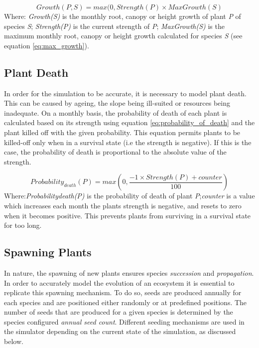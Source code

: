 \begin{equation}
Growth(\textit{P},S) = max(0, Strength(\textit{P}) \times  MaxGrowth(S)
\label{eq:actual_growth}
\end{equation}
Where: \textit{Growth(S)} is the monthly root, canopy or height growth of plant \textit{P} of species \textit{S}; \textit{Strength(P)} is the current strength of \textit{P}; \textit{MaxGrowth(S)} is the maximum monthly root, canopy or height growth calculated for species \textit{S} (see equation \ref{eq:max_growth}).

\subsection{Plant Death}

In order for the simulation to be accurate, it is necessary to model plant death. This can be caused by ageing, the slope being ill-suited or resources being inadequate. On a monthly basis, the probability of death of each plant is calculated based on its strength using equation \ref{eq:probability_of_death} and the plant killed off with the given probability. This equation permits plants to be killed-off only when in a survival state (i.e the strength is negative). If this is the case, the probability of death is proportional to the absolute value of the strength. 

\begin{equation}
Probability_{death}(P) = max(0, \frac{-1 \times Strength(P) + counter}{100})
\label{eq:probability_of_death}
\end{equation}
Where:\textit{Probability{death}(P)} is the probability of death of plant \textit{P};\textit{counter} is a value which increases each month the plants strength is negative, and resets to zero when it becomes positive. This prevents plants from surviving in a survival state for too long.

\subsection{Spawning Plants} \label{subsec:spawning_plants}

In nature, the spawning of new plants ensures species \textit{succession} and \textit{propagation}. In order to accurately model the evolution of an ecosystem it is essential to replicate this spawning mechanism. To do so, seeds are produced annually for each species and are positioned either randomly or at predefined positions. The number of seeds that are produced for a given species is determined by the species configured \textit{annual seed count}. Different seeding mechanisms are used in the simulator depending on the current state of the simulation, as discussed below.\\ 

